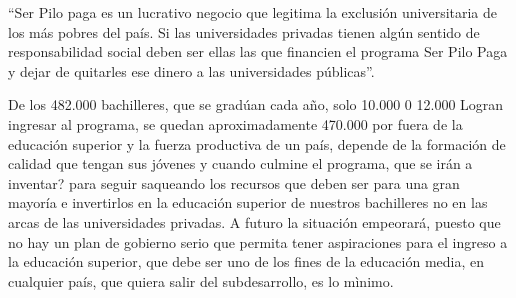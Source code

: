 \documentclass[10pt,twoside]{article}
\begin{document}
“Ser Pilo paga es un lucrativo negocio que legitima la exclusión universitaria de los más pobres del país. Si las universidades privadas tienen algún sentido de responsabilidad social deben ser ellas las que financien el programa Ser Pilo Paga y dejar de quitarles ese dinero a las universidades públicas”.

De los 482.000 bachilleres, que se gradúan  cada año,  solo 10.000 0 12.000  Logran ingresar al programa,  se quedan aproximadamente 470.000 por fuera de la educación superior y la fuerza productiva de un país, depende de la formación de  calidad que tengan sus jóvenes y cuando culmine el programa, que se irán a inventar? para seguir saqueando los recursos que deben ser para una gran mayoría e invertirlos en la educación superior de nuestros bachilleres no en las arcas de las universidades privadas. A futuro la situación empeorará, puesto que no hay un plan de gobierno serio que permita tener aspiraciones para el ingreso a la educación superior, que debe ser uno de los fines de la educación media, en cualquier país, que quiera salir del  subdesarrollo, es lo mìnimo.
\end{document}
